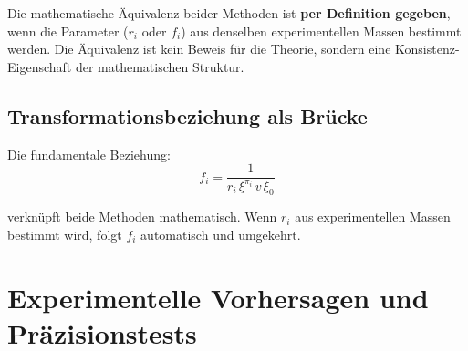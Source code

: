 	\begin{keypoint}
		Die mathematische Äquivalenz beider Methoden ist \textbf{per Definition gegeben}, wenn die Parameter ($r_i$ oder $f_i$) aus denselben experimentellen Massen bestimmt werden. Die Äquivalenz ist kein Beweis für die Theorie, sondern eine Konsistenz-Eigenschaft der mathematischen Struktur.
	\end{keypoint}
	
	\subsection{Transformationsbeziehung als Brücke}
	\label{subsec:transformationsbeziehung}
	
	Die fundamentale Beziehung:
	\begin{equation}
		f_i = \frac{1}{r_i \, \xi^{\pi_i} \, v \, \xi_0}
		\label{eq:transformation_bridge}
	\end{equation}
	
	verknüpft beide Methoden mathematisch. Wenn $r_i$ aus experimentellen Massen bestimmt wird, folgt $f_i$ automatisch und umgekehrt.
	
	\begin{table}[H]
		\centering
		\caption{Numerische Äquivalenz beider T0-Methoden für alle Leptonen}
		\label{tab:numerische_aequivalenz_komplett}
	\end{table}
	
	\section{Experimentelle Vorhersagen und Präzisionstests}
	\label{sec:experimentelle_vorhersagen}
	
